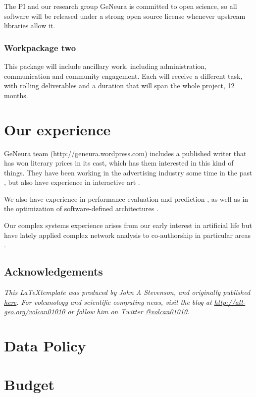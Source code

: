 \documentclass[a4paper,12pt,twocolumn]{article}
\begin{document}
The PI and our research group GeNeura is committed to open science, so
all software will be released under a strong open source license
whenever upstream libraries allow it.

\subsubsection{Workpackage two}

This package will include ancillary work, including administration,
communication and community engagement. Each will receive a different
task, with rolling deliverables and a duration that will span the
whole project, 12 months.


 



\section{Our experience}
\label{sec:exp}

GeNeura team (http://geneura.wordpress.com) includes a published
writer that has won literary prices in its cast, which has them
interested in this kind of things. They have been working in the
advertising industry some time in the past
\cite{merelo:ecal97,AISB97}, but also have experience in interactive
art \cite{DBLP:conf/cec/TrujilloVVG13,DBLP:conf/cec/FernandesIBRG11}.


We also have experience in performance evaluation and prediction
\cite{castillo:evostar08,hardwareevo}, as well as in the optimization of
software-defined architectures \cite{gecco08:castillo}.

Our complex systems experience arises from our early interest in
artificial life \cite{ecal93} but have lately applied complex network
analysis to co-authorship in particular areas
\cite{ec-network-2007,merelo2013complex,DBLP:journals/corr/abs-1108-0261}. 

\subsection*{Acknowledgements}
\textit{This \LaTeX template was produced by John A Stevenson, and originally published \href{http://all-geo.org/volcan01010/2013/07/grant-applications-are-hard-work-includes-latex-template}{here}.  For volcanology and scientific computing news, visit the blog at \href{http://all-geo.org/volcan01010}{http://all-geo.org/volcan01010} or follow him on Twitter \href{https://twitter.com/volcan01010}{@volcan01010}.}


\twocolumn[
  \begin{@twocolumnfalse}

\end{@twocolumnfalse}
]

\section{Data Policy}

\section{Budget}
\end{document}
